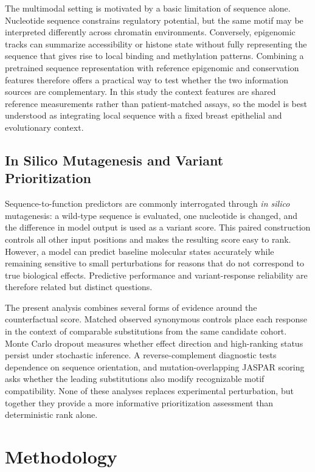 \documentclass[10pt,letterpaper,twocolumn]{article}
\begin{document}
The multimodal setting is motivated by a basic limitation of sequence
alone. Nucleotide sequence constrains regulatory potential, but the same
motif may be interpreted differently across chromatin environments.
Conversely, epigenomic tracks can summarize accessibility or histone
state without fully representing the sequence that gives rise to local
binding and methylation patterns. Combining a pretrained sequence
representation with reference epigenomic and conservation features
therefore offers a practical way to test whether the two information
sources are complementary. In this study the context features are shared
reference measurements rather than patient-matched assays, so the model
is best understood as integrating local sequence with a fixed breast
 epithelial and evolutionary context.

\subsection{In Silico Mutagenesis and Variant Prioritization}

Sequence-to-function predictors are commonly interrogated through
\textit{in silico} mutagenesis: a wild-type sequence is evaluated,
one nucleotide is changed, and the difference in model output is used
as a variant score. This paired construction controls all other input
positions and makes the resulting score easy to rank. However, a model
can predict baseline molecular states accurately while remaining
sensitive to small perturbations for reasons that do not correspond to
true biological effects. Predictive performance and variant-response
reliability are therefore related but distinct questions.

The present analysis combines several forms of evidence around the
counterfactual score. Matched observed synonymous controls place each
response in the context of comparable substitutions from the same
candidate cohort. Monte Carlo dropout measures whether effect direction
and high-ranking status persist under stochastic inference. A
reverse-complement diagnostic tests dependence on sequence orientation,
and mutation-overlapping JASPAR scoring asks whether the leading
substitutions also modify recognizable motif compatibility. None of
these analyses replaces experimental perturbation, but together they
provide a more informative prioritization assessment than deterministic
rank alone.


\section{Methodology}
\label{sec:methodology}
\end{document}
